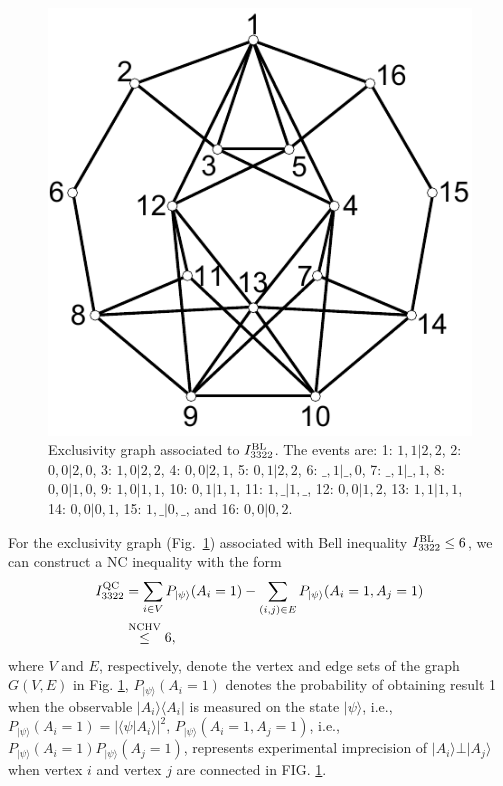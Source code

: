 \documentclass[prl,letterpaper,english,reprint,nofootinbib,aps,superscriptaddress,showpacs,showkeys]{revtex4-1}
\theoremstyle{definition}
\theoremstyle{remark}
\begin{document}
\begin{figure}[h]
\centering
\includegraphics[scale=0.4]{i3322.pdf}
\caption{\label{Fig7}Exclusivity graph associated to $I_{3322}^{\rm BL}$.
The events are: 
 1: $1,1|2,2$,
 2: $0,0|2,0$,
 3: $1,0|2,2$,
 4: $0,0|2,1$,
 5: $0,1|2,2$,
 6: $\_,1|\_,0$,
 7: $\_,1|\_,1$,
 8: $0,0|1,0$,
 9: $1,0|1,1$,
10: $0,1|1,1$,
11: $1,\_|1,\_$,
12: $0,0|1,2$,
13: $1,1|1,1$,
14: $0,0|0,1$,
15: $1,\_|0,\_$, and
16: $0,0|0,2$.}
\end{figure}


For the exclusivity graph (Fig.~\ref{Fig7}) associated with Bell inequality $I_{3322}^{\rm BL}\leq 6$,
we can construct a NC inequality with the form~\cite{cabello16}
\begin{align}
I_{3322}^{\rm QC}
&=\sum_{i\in V}P_{|\psi\rangle}(A_i=1)-\sum_{(i,j)\in E}P_{|\psi\rangle}(A_i=1,A_j=1)\nonumber\\
&\overset{{\rm{NCHV}}}\leq 6,
\label{I3322QC}
\end{align}
where $V$ and $E$, respectively, denote the vertex and edge sets of the graph $G(V,E)$ in Fig. \ref{Fig7},
$P_{|\psi\rangle}(A_i=1)$ denotes the probability of obtaining result 1 when the observable $|A_i\rangle\langle A_i|$ is measured on the state $|\psi\rangle $,  i.e., $P_{|\psi\rangle}(A_i=1)= |\langle \psi|A_i\rangle|^2$, $P_{|\psi\rangle}(A_i=1,A_j=1)$, i.e.,  $P_{|\psi\rangle}(A_i=1)P_{|\psi\rangle}(A_j=1)$, represents experimental imprecision of $|A_i\rangle\bot |A_j\rangle$ when vertex $i$ and vertex $j$ are connected in FIG. \ref{Fig7}.
\end{document}
